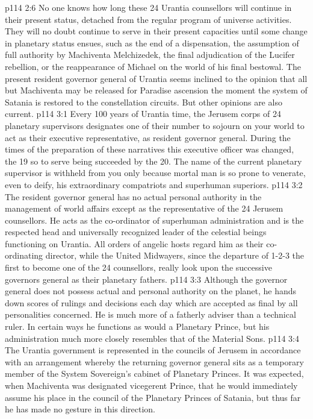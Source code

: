 \vs p114 2:6 No one knows how long these 24 Urantia counsellors will continue in their present status, detached from the regular program of universe activities. They will no doubt continue to serve in their present capacities until some change in planetary status ensues, such as the end of a dispensation, the assumption of full authority by Machiventa Melchizedek, the final adjudication of the Lucifer rebellion, or the reappearance of Michael on the world of his final bestowal. The present resident governor general of Urantia seems inclined to the opinion that all but Machiventa may be released for Paradise ascension the moment the system of Satania is restored to the constellation circuits. But other opinions are also current.
\vs p114 3:1 Every 100 years of Urantia time, the Jerusem corps of 24 planetary supervisors designates one of their number to sojourn on your world to act as their executive representative, as resident governor general. During the times of the preparation of these narratives this executive officer was changed, the 19 so to serve being succeeded by the 20. The name of the current planetary supervisor is withheld from you only because mortal man is so prone to venerate, even to deify, his extraordinary compatriots and superhuman superiors.
\vs p114 3:2 The resident governor general has no actual personal authority in the management of world affairs except as the representative of the 24 Jerusem counsellors. He acts as the co\hyp{}ordinator of superhuman administration and is the respected head and universally recognized leader of the celestial beings functioning on Urantia. All orders of angelic hosts regard him as their co\hyp{}ordinating director, while the United Midwayers, since the departure of 1\hyp{}2\hyp{}3 the first to become one of the 24 counsellors, really look upon the successive governors general as their planetary fathers.
\vs p114 3:3 Although the governor general does not possess actual and personal authority on the planet, he hands down scores of rulings and decisions each day which are accepted as final by all personalities concerned. He is much more of a fatherly adviser than a technical ruler. In certain ways he functions as would a Planetary Prince, but his administration much more closely resembles that of the Material Sons.
\vs p114 3:4 \pc The Urantia government is represented in the councils of Jerusem in accordance with an arrangement whereby the returning governor general sits as a temporary member of the System Sovereign’s cabinet of Planetary Princes. It was expected, when Machiventa was designated vicegerent Prince, that he would immediately assume his place in the council of the Planetary Princes of Satania, but thus far he has made no gesture in this direction.
